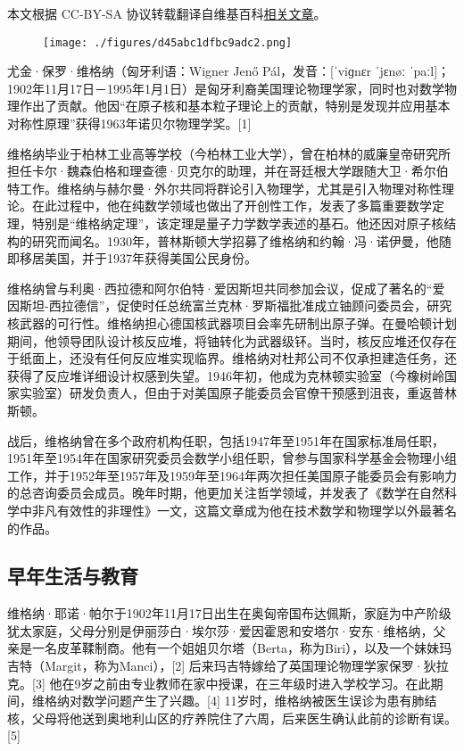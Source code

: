 
本文根据 CC-BY-SA 协议转载翻译自维基百科\href{https://en.wikipedia.org/wiki/Eugene_Wigner}{相关文章}。

\begin{figure}[ht]
\centering
\texttt{[image: ./figures/d45abc1dfbc9adc2.png]}
\caption{} \label{fig_YJwgn_1}
\end{figure}
尤金·保罗·维格纳（匈牙利语：Wigner Jenő Pál，发音：[ˈviɡnɛr ˈjɛnøː ˈpaːl]；1902年11月17日－1995年1月1日）是匈牙利裔美国理论物理学家，同时也对数学物理作出了贡献。他因“在原子核和基本粒子理论上的贡献，特别是发现并应用基本对称性原理”获得1963年诺贝尔物理学奖。[1]

维格纳毕业于柏林工业高等学校（今柏林工业大学），曾在柏林的威廉皇帝研究所担任卡尔·魏森伯格和理查德·贝克尔的助理，并在哥廷根大学跟随大卫·希尔伯特工作。维格纳与赫尔曼·外尔共同将群论引入物理学，尤其是引入物理对称性理论。在此过程中，他在纯数学领域也做出了开创性工作，发表了多篇重要数学定理，特别是“维格纳定理”，该定理是量子力学数学表述的基石。他还因对原子核结构的研究而闻名。1930年，普林斯顿大学招募了维格纳和约翰·冯·诺伊曼，他随即移居美国，并于1937年获得美国公民身份。

维格纳曾与利奥·西拉德和阿尔伯特·爱因斯坦共同参加会议，促成了著名的“爱因斯坦-西拉德信”，促使时任总统富兰克林·罗斯福批准成立铀顾问委员会，研究核武器的可行性。维格纳担心德国核武器项目会率先研制出原子弹。在曼哈顿计划期间，他领导团队设计核反应堆，将铀转化为武器级钚。当时，核反应堆还仅存在于纸面上，还没有任何反应堆实现临界。维格纳对杜邦公司不仅承担建造任务，还获得了反应堆详细设计权感到失望。1946年初，他成为克林顿实验室（今橡树岭国家实验室）研发负责人，但由于对美国原子能委员会官僚干预感到沮丧，重返普林斯顿。

战后，维格纳曾在多个政府机构任职，包括1947年至1951年在国家标准局任职，1951年至1954年在国家研究委员会数学小组任职，曾参与国家科学基金会物理小组工作，并于1952年至1957年及1959年至1964年两次担任美国原子能委员会有影响力的总咨询委员会成员。晚年时期，他更加关注哲学领域，并发表了《数学在自然科学中非凡有效性的非理性》一文，这篇文章成为他在技术数学和物理学以外最著名的作品。
\subsection{早年生活与教育}
维格纳·耶诺·帕尔于1902年11月17日出生在奥匈帝国布达佩斯，家庭为中产阶级犹太家庭，父母分别是伊丽莎白·埃尔莎·爱因霍恩和安塔尔·安东·维格纳，父亲是一名皮革鞣制商。他有一个姐姐贝尔塔（Berta，称为Biri），以及一个妹妹玛吉特（Margit，称为Manci），[2] 后来玛吉特嫁给了英国理论物理学家保罗·狄拉克。[3] 他在9岁之前由专业教师在家中授课，在三年级时进入学校学习。在此期间，维格纳对数学问题产生了兴趣。[4] 11岁时，维格纳被医生误诊为患有肺结核，父母将他送到奥地利山区的疗养院住了六周，后来医生确认此前的诊断有误。[5]

